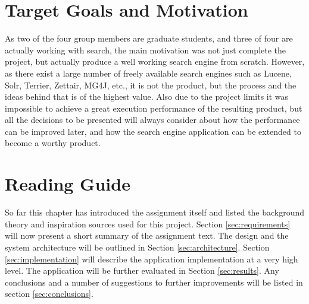 \section{Target Goals and Motivation}
As two of the four group members are graduate students, and three of four are actually working with search, the main motivation was not just complete the project, but actually produce a well working search engine from scratch. However, as there exist a large number of freely available search engines such as Lucene, Solr, Terrier, Zettair, MG4J, etc., it is not the product, but the process and the ideas behind that is of the highest value. Also due to the project limits it was impossible to achieve a great execution performance of the resulting product, but all the decisions to be presented will always consider about how the performance can be improved later, and how the search engine application can be extended to become a worthy product.

\section{Reading Guide}
So far this chapter has introduced the assignment itself and listed the background theory and inspiration sources used for this project. Section \ref{sec:requirements} will now present a short summary of the assignment text. The design and the system architecture will be outlined in Section \ref{sec:architecture}. Section \ref{sec:implementation} will describe the application implementation at a very high level. The application will be further evaluated in Section \ref{sec:results}. Any conclusions and a number of suggestions to further improvements will be listed in section \ref{sec:conclusions}.